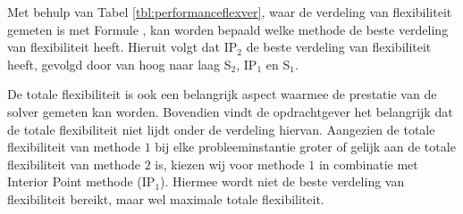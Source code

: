 Met behulp van Tabel \ref{tbl:performanceflexver}, waar de verdeling van flexibiliteit gemeten is met Formule \label{eq:mse}, kan worden bepaald welke methode de beste verdeling van flexibiliteit heeft. Hieruit volgt dat IP$_2$ de beste verdeling van flexibiliteit heeft, gevolgd door van hoog naar laag S$_2$, IP$_1$ en S$_1$. 

De totale flexibiliteit is ook een belangrijk aspect waarmee de prestatie van de solver gemeten kan worden. Bovendien vindt de opdrachtgever het belangrijk dat de totale flexibiliteit niet lijdt onder de verdeling hiervan. Aangezien de totale flexibiliteit van methode $1$ bij elke probleeminstantie groter of gelijk aan de totale flexibiliteit van methode $2$ is, kiezen wij voor methode $1$ in combinatie met Interior Point methode (IP$_1$). Hiermee wordt niet de beste verdeling van flexibiliteit bereikt, maar wel maximale totale flexibiliteit.
